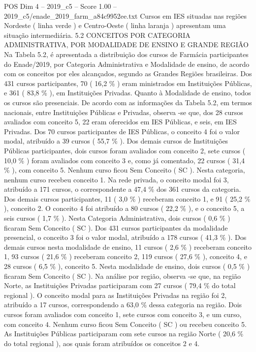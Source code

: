 \begin{textsample}{POS Dim 4 – 2019\_c5 – Score 1.00 – 2019\_c5/enade\_2019\_farm\_a84c9952ee.txt}
Cursos em IES situadas nas regiões Nordeste ( linha verde ) e Centro-Oeste ( linha laranja ) apresentam uma situação intermediária. 5.2 CONCEITOS POR CATEGORIA ADMINISTRATIVA, POR MODALIDADE DE ENSINO E GRANDE REGIÃO Na Tabela 5.2, é apresentada a distribuição dos cursos de Farmácia participantes do Enade/2019, por Categoria Administrativa e Modalidade de ensino, de acordo com os conceitos por eles alcançados, segundo as Grandes Regiões brasileiras.
Dos 431 cursos participantes, 70 ( 16,2 \% ) eram ministrados em Instituições Públicas, e 361 ( 83,8 \% ), em Instituições Privadas.
Quanto à Modalidade de ensino, todos os cursos são presenciais.
De acordo com as informações da Tabela 5.2, em termos nacionais, entre Instituições Públicas e Privadas, observa -se que, dos 28 cursos avaliados com conceito 5, 22 eram oferecidos em IES Públicas, e seis, em IES Privadas.
Dos 70 cursos participantes de IES Públicas, o conceito 4 foi o valor modal, atribuído a 39 cursos ( 55,7 \% ).
Dos demais cursos de Instituições Públicas participantes, dois cursos foram avaliados com conceito 2, sete cursos ( 10,0 \% ) foram avaliados com conceito 3 e, como já comentado, 22 cursos ( 31,4 \% ), com conceito 5.
Nenhum curso ficou Sem Conceito ( SC ).
Nesta categoria, nenhum curso recebeu conceito 1.
Na rede privada, o conceito modal foi 3, atribuído a 171 cursos, o correspondente a 47,4 \% dos 361 cursos da categoria.
Dos demais cursos participantes, 11 ( 3,0 \% ) receberam conceito 1, e 91 ( 25,2 \% ), conceito 2.
O conceito 4 foi atribuído a 80 cursos ( 22,2 \% ), e o conceito 5, a seis cursos ( 1,7 \% ).
Nesta Categoria Administrativa, dois cursos ( 0,6 \% ) ficaram Sem Conceito ( SC ).
Dos 431 cursos participantes da modalidade presencial, o conceito 3 foi o valor modal, atribuído a 178 cursos ( 41,3 \% ).
Dos demais cursos nesta modalidade de ensino, 11 cursos ( 2,6 \% ) receberam conceito 1, 93 cursos ( 21,6 \% ) receberam conceito 2, 119 cursos ( 27,6 \% ), conceito 4, e 28 cursos ( 6,5 \% ), conceito 5.
Nesta modalidade de ensino, dois cursos ( 0,5 \% ) ficaram Sem Conceito ( SC ).
Na análise por região, observa -se que, na região Norte, as Instituições Privadas participaram com 27 cursos ( 79,4 \% do total regional ).
O conceito modal para as Instituições Privadas na região foi 2, atribuído a 17 cursos, correspondendo a 63,0 \% dessa categoria na região.
Dois cursos foram avaliados com conceito 1, sete cursos com conceito 3, e um curso, com conceito 4.
Nenhum curso ficou Sem Conceito ( SC ) ou recebeu conceito 5.
As Instituições Públicas participaram com sete cursos na região Norte ( 20,6 \% do total regional ), aos quais foram atribuídos os conceitos 2 e 4.

\end{textsample}
